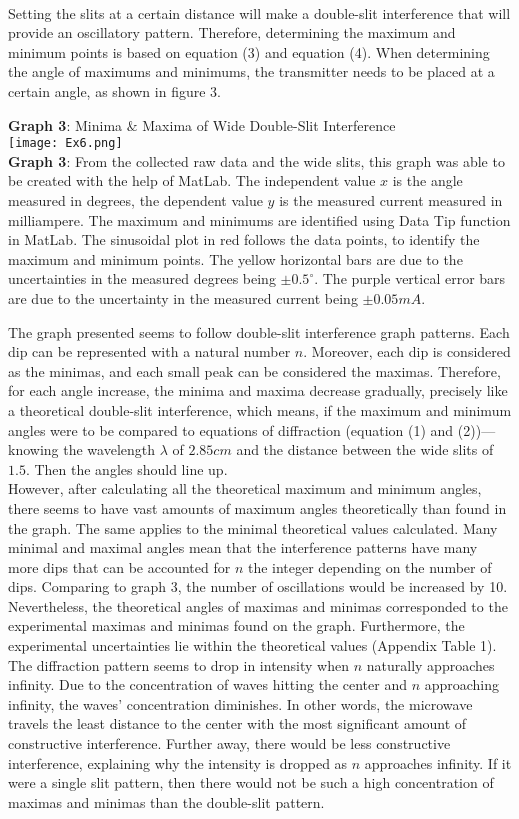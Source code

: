 \documentclass[11pt]{article}
\begin{document}
\\Setting the slits at a certain distance will make a double-slit interference that will provide an oscillatory pattern. Therefore, determining the maximum and minimum points is based on equation (3) and equation (4).  When determining the angle of maximums and minimums, the transmitter needs to be placed at a certain angle, as shown in figure 3. 
\begin{center}
    \textbf{Graph 3}: Minima $\&$ Maxima of Wide Double-Slit Interference\\
    \texttt{[image: Ex6.png]}\\\textbf{Graph 3}: From the collected raw data and the wide slits, this graph was able to be created with the help of MatLab. The independent value $x$ is the angle measured in degrees, the dependent value $y$ is the measured current measured in milliampere. The maximum and minimums are identified using Data Tip function in MatLab. The sinusoidal plot in red follows the data points, to identify the maximum and minimum points. The yellow horizontal bars are due to the uncertainties in the measured degrees being $\pm 0.5^\circ$. The purple vertical error bars are due to the uncertainty in the measured current being $\pm 0.05 mA$. 
\end{center}
The graph presented seems to follow double-slit interference graph patterns. Each dip can be represented with a natural number $n$. Moreover, each dip is considered as the minimas, and each small peak can be considered the maximas. Therefore, for each angle increase, the minima and maxima decrease gradually, precisely like a theoretical double-slit interference, which means, if the maximum and minimum angles were to be compared to equations of diffraction (equation (1) and (2))— knowing the wavelength $\lambda$ of $2.85cm$ and the distance between the wide slits of $1.5$. Then the angles should line up.\\
However, after calculating all the theoretical maximum and minimum angles, there seems to have vast amounts of maximum angles theoretically than found in the graph. The same applies to the minimal theoretical values calculated. Many minimal and maximal angles mean that the interference patterns have many more dips that can be accounted for $n$ the integer depending on the number of dips. Comparing to graph 3, the number of oscillations would be increased by 10. Nevertheless, the theoretical angles of maximas and minimas corresponded to the experimental maximas and minimas found on the graph. Furthermore, the experimental uncertainties lie within the theoretical values (Appendix Table 1).\\
The diffraction pattern seems to drop in intensity when $n$ naturally approaches infinity. Due to the concentration of waves hitting the center and $n$ approaching infinity, the waves' concentration diminishes. In other words, the microwave travels the least distance to the center with the most significant amount of constructive interference. Further away, there would be less constructive interference, explaining why the intensity is dropped as $n$ approaches infinity. If it were a single slit pattern, then there would not be such a high concentration of maximas and minimas than the double-slit pattern. 
\end{document}
